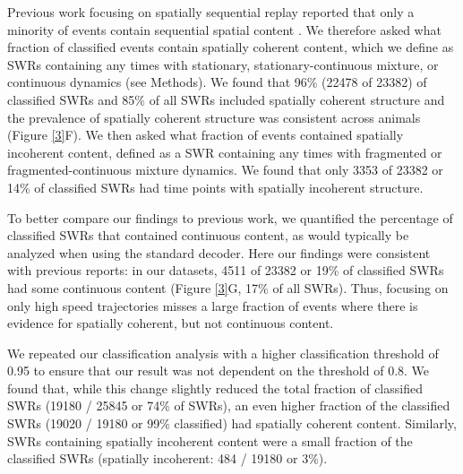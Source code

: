 \documentclass[times, twoside]{zHenriquesLab-StyleBioRxiv}
\begin{document}
Previous work focusing on spatially sequential replay reported that only a minority of events contain sequential spatial content \cite{KarlssonAwakereplayremote2009, FosterReversereplaybehavioural2006, DavidsonHippocampalReplayExtended2009}. We therefore asked what fraction of classified events contain spatially coherent content, which we define as SWRs containing any times with stationary, stationary-continuous mixture, or continuous dynamics (see Methods). We found that 96\% (22478 of 23382) of classified SWRs and 85\% of all SWRs included spatially coherent structure and the prevalence of spatially coherent structure was consistent across animals (Figure \ref{3}F). We then asked what fraction of events contained spatially incoherent content, defined as a SWR containing any times with fragmented or fragmented-continuous mixture dynamics. We found that only 3353 of 23382 or 14\% of classified SWRs had time points with spatially incoherent structure.

To better compare our findings to previous work, we quantified the percentage of classified SWRs that contained continuous content, as would typically be analyzed when using the standard decoder. Here our findings were consistent with previous reports: in our datasets, 4511 of 23382 or 19\% of classified SWRs had some continuous content (Figure \ref{3}G, 17\% of all SWRs). Thus, focusing on only high speed trajectories misses a large fraction of events where there is evidence for spatially coherent, but not continuous content.

We repeated our classification analysis with a higher classification threshold of 0.95 to ensure that our result was not dependent on the threshold of 0.8. We found that, while this change slightly reduced the total fraction of classified SWRs (19180 / 25845 or 74\% of SWRs), an even higher fraction of the classified SWRs (19020 / 19180 or 99\% classified) had spatially coherent content. Similarly, SWRs containing spatially incoherent content were a small fraction of the classified SWRs (spatially incoherent: 484 / 19180 or 3\%).
\end{document}
